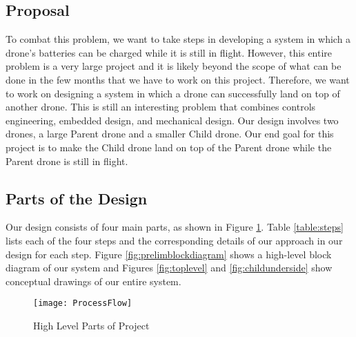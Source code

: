 \documentclass[paper=a4, fontsize=12pt]{scrartcl}
\begin{document}
\subsection{Proposal}
To combat this problem, we want to take steps in developing a system in which a drone's batteries can be charged while it is still in flight.
However, this entire problem is a very large project and it is likely beyond the scope of what can be done in the few months that we have to work on this project.
Therefore, we want to work on designing a system in which a drone can successfully land on top of another drone.
This is still an interesting problem that combines controls engineering, embedded design, and mechanical design. 
Our design involves two drones, a large Parent drone and a smaller Child drone.
Our end goal for this project is to make the Child drone land on top of the Parent drone while the Parent drone is still in flight. 

\subsection{Parts of the Design}
Our design consists of four main parts, as shown in Figure \ref{fig:process}. 
Table \ref{table:steps} lists each of the four steps and the corresponding details of our approach in our design for each step.
Figure \ref{fig:prelimblockdiagram} shows a high-level block diagram of our system and Figures \ref{fig:toplevel} and \ref{fig:childunderside} show conceptual drawings of our entire system.

\begin{figure}[h!]
	\centering
	\texttt{[image: ProcessFlow]}
	\caption{High Level Parts of Project}
	\label{fig:process}
\end{figure}
\end{document}
